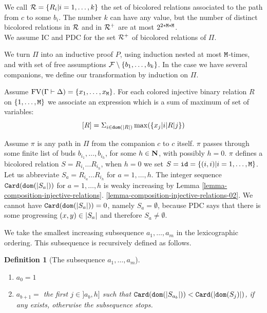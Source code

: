 \documentclass{lmcs}
\newtheorem{definition}[theorem]{Definition}
\begin{document}
We call ${\mathcal R} = \{R_i | i=1, \ldots, k\}$
the set of bicolored relations associated to the path from $c$ to some $b_i$. The number $k$
can have any value, but the number of distinct bicolored relations in ${\mathcal R}$ and in ${\mathcal R}^+$
are at most $2^{2*{\tt M}*{\tt M}}$.
\\
  
We assume IC and PDC for the set ${\mathcal R}^+$ of bicolored relations of $\Pi$.

We turn $\Pi$ into an inductive proof $P$, using
induction nested at most ${\tt M}$-times, and with set of free assumptions 
${\mathcal F} \setminus \{b_1, \ldots, b_k\}$. 
In the case we have several companions, we define our transformation 
by induction on $\Pi$.

Assume ${{\rm FV}}(\Gamma \vdash \Delta) = \{x_1, \ldots, x_{{\tt M}}\}$. For each
colored injective binary relation $R$ on $\{1, \ldots, {{\tt M}}\}$ we associate an
expression which is a sum of maximum of set of variables:
$$
[R] 
= 
\Sigma_{i \in {\tt dom}({| R |})} \max(\{x_j | i {| R |} j\})
$$

Assume $\pi$ is any path in $\Pi$ from the companion $c$ to $c$ itself. 
$\pi$ passes through some finite list of buds $b_{i_1}, \ldots, b_{i_h}$, for some $h \in {\bf N}$,
with possibly $h=0$. $\pi$ defines a bicolored relation $S = R_{i_1}  \ldots  R_{i_h}$,
when $h=0$ we set $S={\tt id}=\{(i,i) | i=1, \ldots, {\tt M}\}$.
Let us abbreviate $S_a =  R_{i_a} \ldots  R_{i_h}$ for $a=1, \ldots,h$.
The integer sequence ${\tt Card}({\tt dom}({| S_a |}))$ for $a=1, \ldots,h$ is weaky increasing
by Lemma \ref{lemma-composition-injective-relations}.
\ref{lemma-composition-injective-relations-02}. 
We cannot have ${\tt Card}({\tt dom}({| S_a |})) = 0$, namely $S_a=\emptyset$,
because PDC says that there is some progressing $(x,y) \in {| S_a |}$
and therefore $S_a \not = \emptyset$.


We take the smallest increasing subsequence ${a_1, \ldots, a_m}$ in the lexicographic ordering. 
This subsequence is recursively defined as follows. 


\begin{definition}[The subsequence ${a_1, \ldots, a_m}$]
\begin{enumerate}
\item
$a_0 = 1$
\item
$a_{b+1}=$ the first $j \in ]a_b,h]$
such that ${\tt Card}({\tt dom}({| S_{a_b} |})) < {\tt Card}({| {\tt dom}(S_j) |})$,
if any exists, otherwise the subsequence stops. 
\end{enumerate}
\end{definition}
\end{document}

